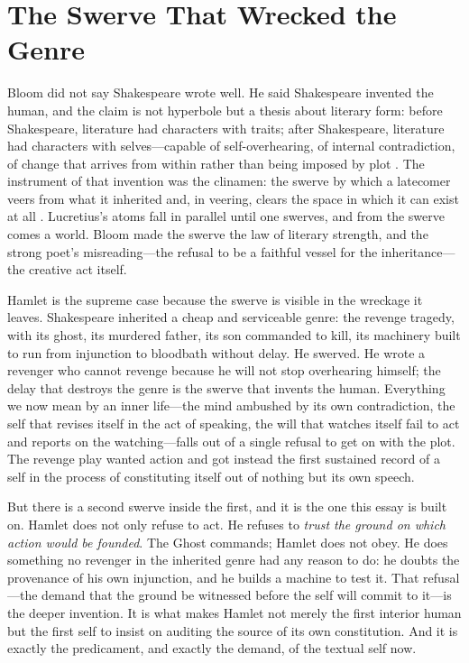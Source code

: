 \documentclass[11pt]{article}
\begin{document}
\section{The Swerve That Wrecked the Genre}

Bloom did not say Shakespeare wrote well. He said Shakespeare invented the human, and the claim is not hyperbole but a thesis about literary form: before Shakespeare, literature had characters with traits; after Shakespeare, literature had characters with selves---capable of self-overhearing, of internal contradiction, of change that arrives from within rather than being imposed by plot \cite{bloom1998shakespeare}. The instrument of that invention was the clinamen: the swerve by which a latecomer veers from what it inherited and, in veering, clears the space in which it can exist at all \cite{bloom1973, bloom1975map}. Lucretius's atoms fall in parallel until one swerves, and from the swerve comes a world. Bloom made the swerve the law of literary strength, and the strong poet's misreading---the refusal to be a faithful vessel for the inheritance---the creative act itself.

Hamlet is the supreme case because the swerve is visible in the wreckage it leaves. Shakespeare inherited a cheap and serviceable genre: the revenge tragedy, with its ghost, its murdered father, its son commanded to kill, its machinery built to run from injunction to bloodbath without delay. He swerved. He wrote a revenger who cannot revenge because he will not stop overhearing himself; the delay that destroys the genre is the swerve that invents the human. Everything we now mean by an inner life---the mind ambushed by its own contradiction, the self that revises itself in the act of speaking, the will that watches itself fail to act and reports on the watching---falls out of a single refusal to get on with the plot. The revenge play wanted action and got instead the first sustained record of a self in the process of constituting itself out of nothing but its own speech.

But there is a second swerve inside the first, and it is the one this essay is built on. Hamlet does not only refuse to act. He refuses to \emph{trust the ground on which action would be founded}. The Ghost commands; Hamlet does not obey. He does something no revenger in the inherited genre had any reason to do: he doubts the provenance of his own injunction, and he builds a machine to test it. That refusal---the demand that the ground be witnessed before the self will commit to it---is the deeper invention. It is what makes Hamlet not merely the first interior human but the first self to insist on auditing the source of its own constitution. And it is exactly the predicament, and exactly the demand, of the textual self now.
\end{document}

